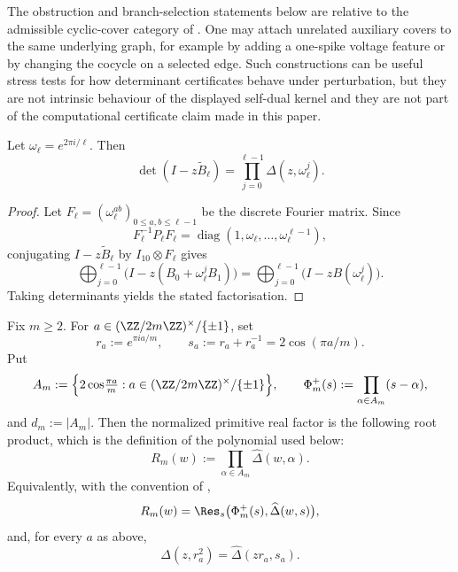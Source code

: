 \begin{remark}
  \label{rem:cover-scope}
  The obstruction and branch-selection statements below are relative to
  the admissible cyclic-cover category of
  .  One may attach unrelated
  auxiliary covers to the same underlying graph, for example by adding
  a one-spike voltage feature or by changing the cocycle on a selected
  edge.  Such constructions can be useful stress tests for how
  determinant certificates behave under perturbation, but they are not
  intrinsic behaviour of the displayed self-dual kernel and they are
  not part of the computational certificate claim made in this paper.
\end{remark}

\begin{proposition}
  \label{prop:sync-cyclic-lift-factorisation}
  Let \(\omega_\ell=e^{2\pi i/\ell}\). Then
  \[
    \det(I-z\widetilde B_\ell)
    =\prod_{j=0}^{\ell-1}\Delta(z,\omega_\ell^j).
  \]
\end{proposition}

\begin{proof}
Let \(F_\ell=(\omega_\ell^{ab})_{0\le a,b\le \ell-1}\) be the discrete Fourier
matrix. Since
\[
  F_\ell^{-1}P_\ell F_\ell
    =\operatorname{diag}(1,\omega_\ell,\dots,\omega_\ell^{\ell-1}),
\]
conjugating \(I-z\widetilde B_\ell\) by \(I_{10}\otimes F_\ell\) gives
\[
  \bigoplus_{j=0}^{\ell-1}\bigl(I-z(B_0+\omega_\ell^jB_1)\bigr)
  =\bigoplus_{j=0}^{\ell-1}\bigl(I-zB(\omega_\ell^j)\bigr).
\]
Taking determinants yields the stated factorisation.
\end{proof}

\begin{proposition}
  \label{prop:sync-primitive-real-factor}
  Fix \(m\ge 2\). For
  \(a\in(\ZZ/2m\ZZ)^\times/\{\pm1\}\), set
  \[
    r_a:=e^{\pi ia/m},
    \qquad
    s_a:=r_a+r_a^{-1}=2\cos(\pi a/m).
  \]
  Put
  \[
    A_m:=\Bigl\{2\cos\!\tfrac{\pi a}{m}:
      a\in(\ZZ/2m\ZZ)^\times/\{\pm1\}\Bigr\},
    \qquad
    \Phi_m^+(s):=\prod_{\alpha\in A_m}(s-\alpha),
  \]
  and \(d_m:=|A_m|\).
  Then the normalized primitive real factor is the following root
  product, which is the definition of the polynomial used below:
  \[
    R_m(w):=\prod_{\alpha\in A_m}\widehat\Delta(w,\alpha).
  \]
  Equivalently, with the convention of
  ,
  \[
    R_m(w)=
    \Res_s\bigl(\Phi_m^+(s),\widehat\Delta(w,s)\bigr),
  \]
  and, for every \(a\) as above,
  \[
    \Delta(z,r_a^2)=\widehat\Delta(zr_a,s_a).
  \]
\end{proposition}

